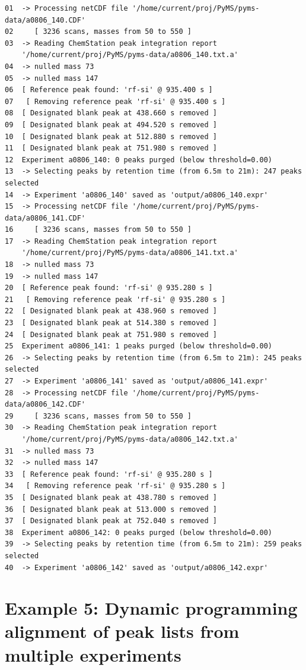 \begin{verbatim}
01  -> Processing netCDF file '/home/current/proj/PyMS/pyms-data/a0806_140.CDF'
02     [ 3236 scans, masses from 50 to 550 ]
03  -> Reading ChemStation peak integration report
    '/home/current/proj/PyMS/pyms-data/a0806_140.txt.a'
04  -> nulled mass 73
05  -> nulled mass 147
06  [ Reference peak found: 'rf-si' @ 935.400 s ]
07   [ Removing reference peak 'rf-si' @ 935.400 s ]
08 	[ Designated blank peak at 438.660 s removed ]
09 	[ Designated blank peak at 494.520 s removed ]
10 	[ Designated blank peak at 512.880 s removed ]
11 	[ Designated blank peak at 751.980 s removed ]
12  Experiment a0806_140: 0 peaks purged (below threshold=0.00)
13  -> Selecting peaks by retention time (from 6.5m to 21m): 247 peaks selected
14  -> Experiment 'a0806_140' saved as 'output/a0806_140.expr'
15  -> Processing netCDF file '/home/current/proj/PyMS/pyms-data/a0806_141.CDF'
16     [ 3236 scans, masses from 50 to 550 ]
17  -> Reading ChemStation peak integration report
    '/home/current/proj/PyMS/pyms-data/a0806_141.txt.a'
18  -> nulled mass 73
19  -> nulled mass 147
20  [ Reference peak found: 'rf-si' @ 935.280 s ]
21   [ Removing reference peak 'rf-si' @ 935.280 s ]
22 	[ Designated blank peak at 438.960 s removed ]
23 	[ Designated blank peak at 514.380 s removed ]
24 	[ Designated blank peak at 751.980 s removed ]
25  Experiment a0806_141: 1 peaks purged (below threshold=0.00)
26  -> Selecting peaks by retention time (from 6.5m to 21m): 245 peaks selected
27  -> Experiment 'a0806_141' saved as 'output/a0806_141.expr'
28  -> Processing netCDF file '/home/current/proj/PyMS/pyms-data/a0806_142.CDF'
29     [ 3236 scans, masses from 50 to 550 ]
30  -> Reading ChemStation peak integration report
    '/home/current/proj/PyMS/pyms-data/a0806_142.txt.a'
31  -> nulled mass 73
32  -> nulled mass 147
33  [ Reference peak found: 'rf-si' @ 935.280 s ]
34   [ Removing reference peak 'rf-si' @ 935.280 s ]
35 	[ Designated blank peak at 438.780 s removed ]
36 	[ Designated blank peak at 513.000 s removed ]
37 	[ Designated blank peak at 752.040 s removed ]
38  Experiment a0806_142: 0 peaks purged (below threshold=0.00)
39  -> Selecting peaks by retention time (from 6.5m to 21m): 259 peaks selected
40  -> Experiment 'a0806_142' saved as 'output/a0806_142.expr'
\end{verbatim}

\section{Example 5: Dynamic programming alignment of peak lists from multiple
experiments}

